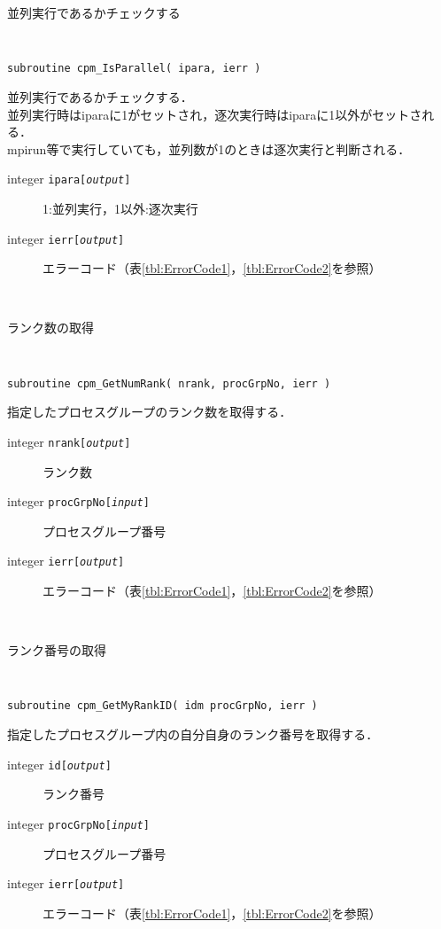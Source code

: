 \begin{spacing}{0.8}
\begin{itembox}[l]{並列実行であるかチェックする}
{\tt
\begin{verbatim}
subroutine cpm_IsParallel( ipara, ierr )
\end{verbatim}
}
並列実行であるかチェックする．\\
並列実行時はiparaに1がセットされ，逐次実行時はiparaに1以外がセットされる．\\
mpirun等で実行していても，並列数が1のときは逐次実行と判断される．
\begin{description}
\item[integer {\tt ipara[{\it output}]}] 1:並列実行，1以外:逐次実行
\item[integer {\tt ierr[{\it output}]}] エラーコード（表\ref{tbl:ErrorCode1}，\ref{tbl:ErrorCode2}を参照）
\end{description}
\end{itembox}\\
\end{spacing}

\begin{spacing}{0.8}
\begin{itembox}[l]{ランク数の取得}
{\tt
\begin{verbatim}
subroutine cpm_GetNumRank( nrank, procGrpNo, ierr )
\end{verbatim}
}
指定したプロセスグループのランク数を取得する．
\begin{description}
\item[integer {\tt nrank[{\it output}]}] ランク数
\item[integer {\tt procGrpNo[{\it input}]}] プロセスグループ番号
\item[integer {\tt ierr[{\it output}]}] エラーコード（表\ref{tbl:ErrorCode1}，\ref{tbl:ErrorCode2}を参照）
\end{description}
\end{itembox}\\
\end{spacing}

\begin{spacing}{0.8}
\begin{itembox}[l]{ランク番号の取得}
{\tt
\begin{verbatim}
subroutine cpm_GetMyRankID( idm procGrpNo, ierr )
\end{verbatim}
}
指定したプロセスグループ内の自分自身のランク番号を取得する．
\begin{description}
\item[integer {\tt id[{\it output}]}] ランク番号
\item[integer {\tt procGrpNo[{\it input}]}] プロセスグループ番号
\item[integer {\tt ierr[{\it output}]}] エラーコード（表\ref{tbl:ErrorCode1}，\ref{tbl:ErrorCode2}を参照）
\end{description}
\end{itembox}\\
\end{spacing}

